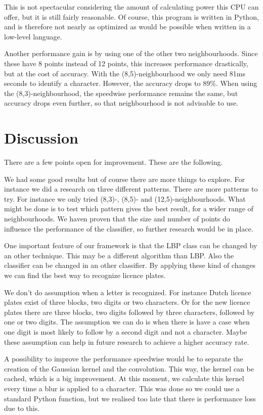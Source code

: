 \documentclass[a4paper]{article}
\begin{document}
This is not spectacular considering the amount of calculating power this CPU
can offer, but it is still fairly reasonable. Of course, this program is
written in Python, and is therefore not nearly as optimized as would be
possible when written in a low-level language.

Another performance gain is by using one of the other two neighbourhoods.
Since these have 8 points instead of 12 points, this increases performance
drastically, but at the cost of accuracy. With the (8,5)-neighbourhood
we only need 81ms seconds to identify a character. However, the accuracy
drops to $89\%$. When using the (8,3)-neighbourhood, the speedwise performance
remains the same, but accuracy drops even further, so that neighbourhood
is not advisable to use.

\section{Discussion}

There are a few points open for improvement. These are the following.

We had some good results but of course there are more things to explore.
For instance we did a research on three different patterns. There are more
patterns to try. For instance we only tried (8,3)-, (8,5)- and
(12,5)-neighbourhoods. What might be done is to test which pattern gives the
best result, for a wider range of neighbourhoods. We haven proven that the size
and number of points do influence the performance of the classifier, so further
research would be in place.

One important feature of our framework is that the LBP class can be changed by
an other technique. This may be a different algorithm than LBP. Also the
classifier can be changed in an other classifier. By applying these kind of
changes we can find the best way to recognize licence plates.

We don't do assumption when a letter is recognized. For instance Dutch licence
plates exist of three blocks, two digits or two characters. Or for the new
licence plates there are three blocks, two digits followed by three characters,
followed by one or two digits. The assumption we can do is when there is have a
case when one digit is most likely to follow by a second digit and not a
character. Maybe these assumption can help in future research to achieve a
higher accuracy rate.

A possibility to improve the performance speedwise would be to separate the
creation of the Gaussian kernel and the convolution. This way, the kernel can
be cached, which is a big improvement. At this moment, we calculate this kernel
every time a blur is applied to a character. This was done so we could use a
standard Python function, but we realised too late that there is performance
loss due to this.
\end{document}

